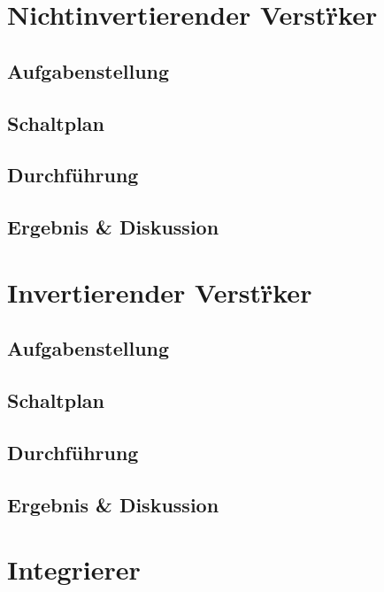 \documentclass[12pt,a4paper,titlepage]{article}
\begin{document}
\setcounter{page}{2}

\newpage
\setcounter{tocdepth}{1}
\tableofcontents

\newpage


\section{Nichtinvertierender Verst\"rker}

\subsection{Aufgabenstellung}

\subsection{Schaltplan}

\subsection{Durchf\"uhrung}

\subsection{Ergebnis \& Diskussion}

\section{Invertierender Verst\"rker}

\subsection{Aufgabenstellung}

\subsection{Schaltplan}

\subsection{Durchf\"uhrung}

\subsection{Ergebnis \& Diskussion}

\section{Integrierer}
\end{document}
